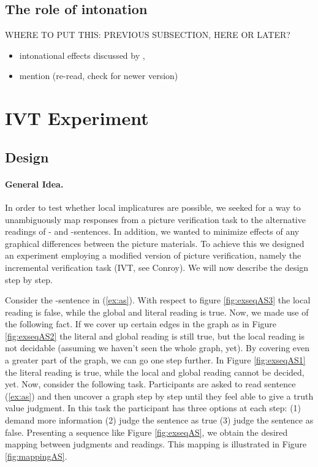 \documentclass[fleqn,reqno,10pt,draft]{article}
\newcommand{\as}{\acro{as}}
\renewcommand{\es}{\acro{es}}
\begin{document}
\subsection{The role of intonation}
\label{sec:role-intonation}

WHERE TO PUT THIS: PREVIOUS SUBSECTION, HERE OR LATER?

\begin{itemize}
\item intonational effects discussed by
  \citet{Horn2006:The-Border-Wars,Geurts2009:Scalar-Implicat,Geurts2010:Quantity-Implic},
  \citep[c.f.][]{ChemlaSpector2010:Experimental-Ev}
\item mention \citet{SchwarzClifton2008:Strengthening-o} (re-read,
  check for newer version)
\end{itemize}

\newpage



\section{IVT Experiment}
\label{sec:exp}

\subsection{Design}
\label{sec:design}

\paragraph{General Idea.} In order to test whether local implicatures
are possible, we seeked for a way to unambiguously map responses from
a picture verification task to the alternative readings of \as- and
\es-sentences. In addition, we wanted to minimize effects of any
graphical differences between the picture materials. To achieve this
we designed an experiment employing a modified version of picture
verification, namely the incremental verification task (IVT, see
Conroy). We will now describe the design step by step.

Consider the \as-sentence in (\ref{ex:as}). With respect to figure
\ref{fig:exseqAS3} the local reading is false, while the global and
literal reading is true. Now, we made use of the following fact. If we
cover up certain edges in the graph as in Figure \ref{fig:exseqAS2}
the literal and global reading is still true, but the local reading is
not decidable (assuming we haven't seen the whole graph, yet). By
covering even a greater part of the graph, we can go one step
further. In Figure \ref{fig:exseqAS1} the literal reading is true,
while the local and global reading cannot be decided, yet. Now,
consider the following task. Participants are asked to read sentence
(\ref{ex:as}) and then uncover a graph step by step until they feel
able to give a truth value judgment. In this task the participant has
three options at each step: (1) demand more information (2) judge the
sentence as true (3) judge the sentence as false. Presenting a
sequence like Figure \ref{fig:exseqAS}, we obtain the desired mapping
between judgments and readings. This mapping is illustrated in Figure
\ref{fig:mappingAS}.
\end{document}
